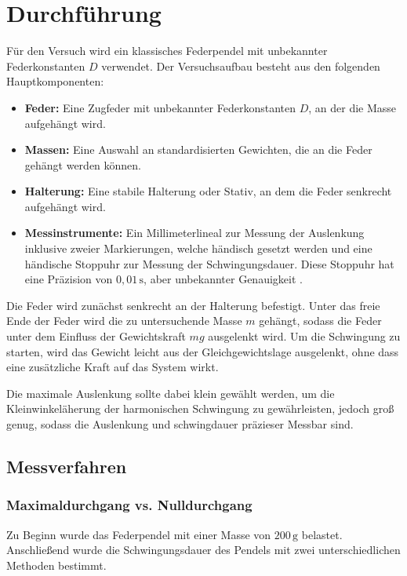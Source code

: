 \chapter{Durchführung}

Für den Versuch wird ein klassisches Federpendel mit unbekannter Federkonstanten $D$ verwendet. Der Versuchsaufbau besteht aus den folgenden Hauptkomponenten:

\begin{itemize}
    \item \textbf{Feder:} Eine Zugfeder mit unbekannter Federkonstanten $D$, an der die Masse aufgehängt wird.
    \item \textbf{Massen:} Eine Auswahl an standardisierten Gewichten, die an die Feder gehängt werden können.
    \item \textbf{Halterung:} Eine stabile Halterung oder Stativ, an dem die Feder senkrecht aufgehängt wird.
    \item \textbf{Messinstrumente:} Ein Millimeterlineal zur Messung der Auslenkung inklusive zweier Markierungen, welche händisch gesetzt werden und eine händische Stoppuhr zur Messung der Schwingungsdauer. Diese Stoppuhr hat eine Präzision von $0,01\,\mathrm{s}$, aber unbekannter Genauigkeit \cite{Stoppuhr}.
\end{itemize}

Die Feder wird zunächst senkrecht an der Halterung befestigt. Unter das freie Ende der Feder wird die zu untersuchende Masse $m$ gehängt, sodass die Feder unter dem Einfluss der Gewichtskraft $mg$ ausgelenkt wird. Um die Schwingung zu starten, wird das Gewicht leicht aus der Gleichgewichtslage ausgelenkt, ohne dass eine zusätzliche Kraft auf das System wirkt.  

Die maximale Auslenkung sollte dabei klein gewählt werden, um die Kleinwinkeläherung der harmonischen Schwingung zu gewährleisten, jedoch groß genug, sodass die Auslenkung und schwingdauer präzieser Messbar sind.

\section{Messverfahren}
\subsection*{Maximaldurchgang vs. Nulldurchgang}

Zu Beginn wurde das Federpendel mit einer Masse von $200\,\mathrm{g}$ belastet. Anschließend wurde die Schwingungsdauer des Pendels mit zwei unterschiedlichen Methoden bestimmt.  

